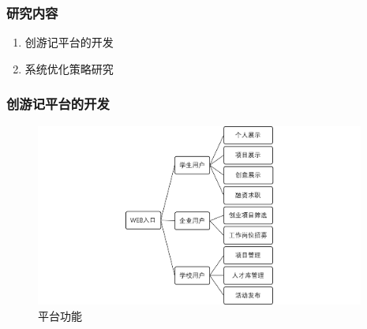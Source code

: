 \documentclass{beamer}
\begin{document}
\begin{frame}
  \frametitle{研究内容}
  \begin{enumerate}
    \item<1-> 创游记平台的开发
    \item<1-> 系统优化策略研究
  \end{enumerate}
\end{frame}

\begin{frame}
  \frametitle{创游记平台的开发}
  \begin{figure}
  \centering
    \includegraphics[height=6cm]{./img/web_frame.png}
    \caption{平台功能}
    \label{fig:visual}
  \end{figure}
\end{frame}
\end{document}
